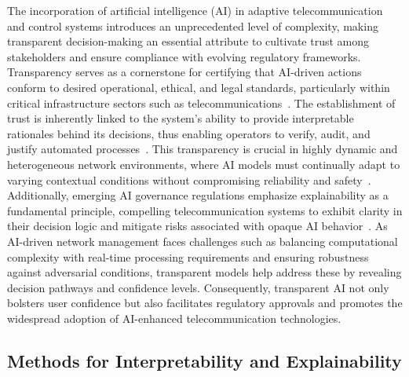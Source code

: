 \documentclass[sigconf]{acmart}
\begin{document}
The incorporation of artificial intelligence (AI) in adaptive telecommunication and control systems introduces an unprecedented level of complexity, making transparent decision-making an essential attribute to cultivate trust among stakeholders and ensure compliance with evolving regulatory frameworks. Transparency serves as a cornerstone for certifying that AI-driven actions conform to desired operational, ethical, and legal standards, particularly within critical infrastructure sectors such as telecommunications~\cite{ref7,ref13}. The establishment of trust is inherently linked to the system’s ability to provide interpretable rationales behind its decisions, thus enabling operators to verify, audit, and justify automated processes~\cite{ref15}. This transparency is crucial in highly dynamic and heterogeneous network environments, where AI models must continually adapt to varying contextual conditions without compromising reliability and safety~\cite{ref48}. Additionally, emerging AI governance regulations emphasize explainability as a fundamental principle, compelling telecommunication systems to exhibit clarity in their decision logic and mitigate risks associated with opaque AI behavior~\cite{ref50}. As AI-driven network management faces challenges such as balancing computational complexity with real-time processing requirements and ensuring robustness against adversarial conditions, transparent models help address these by revealing decision pathways and confidence levels. Consequently, transparent AI not only bolsters user confidence but also facilitates regulatory approvals and promotes the widespread adoption of AI-enhanced telecommunication technologies.

\subsection{Methods for Interpretability and Explainability}
\end{document}

